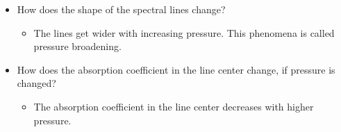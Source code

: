 \documentclass[paper=a4, fontsize=11pt]{scrartcl} %
\begin{document}
\begin{itemize}
    \item How does the shape of the spectral lines change?
    \begin{itemize}
        \item The lines get wider with increasing pressure. This phenomena is called pressure broadening.
    \end{itemize}
    \item How does the absorption coefficient in the line center change, if pressure is changed?
    \begin{itemize}
        \item The absorption coefficient in the line center decreases with higher pressure.
    \end{itemize}
\end{itemize}
\end{document}
